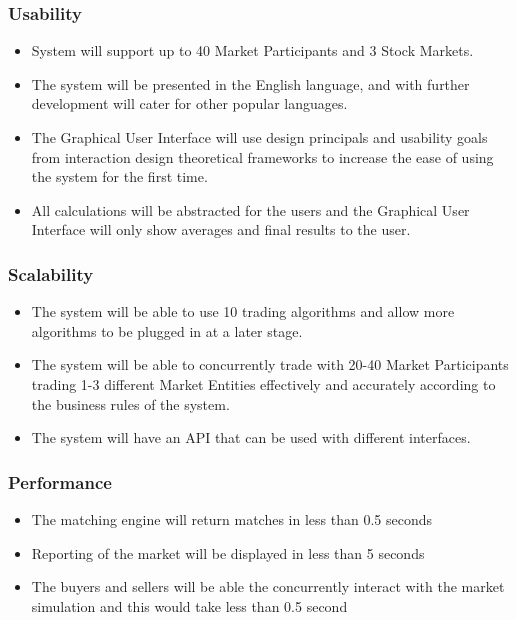 \documentclass[12pt]{article}
\begin{document}
			    	\subsubsection{Usability}
			    	\begin{itemize}
			    		\item System will support up to 40 Market Participants and 3 Stock Markets.
                                        \item The system will be presented in the English language, and with further development will cater for other popular languages.
                                        \item The Graphical User Interface will use design principals and usability goals from interaction design theoretical frameworks to increase the ease of using the system for the first time.
                                        \item All calculations will be abstracted for the users and the Graphical User Interface will only show averages and final results to the user.
                                \end{itemize}
			    
			    	\subsubsection{Scalability}
			    	\begin{itemize}
			    		\item The system will be able to use 10 trading algorithms and allow more algorithms to be plugged in at a later stage.
                                        \item The system will be able to concurrently trade with 20-40 Market Participants trading 1-3 different Market Entities effectively and accurately according to the business rules of the system.
                                        \item The system will have an API that can be used with different interfaces. 
                                \end{itemize}
			    	
			    	\subsubsection{Performance}
			    	\begin{itemize}
			    		\item The matching engine will return matches in less than 0.5 seconds
                                        \item Reporting of the market will be displayed in less than 5 seconds
                                        \item The buyers and sellers will be able the concurrently interact with the market simulation and this would take less than 0.5 second
                                \end{itemize} 
			    	    		
\end{document}
